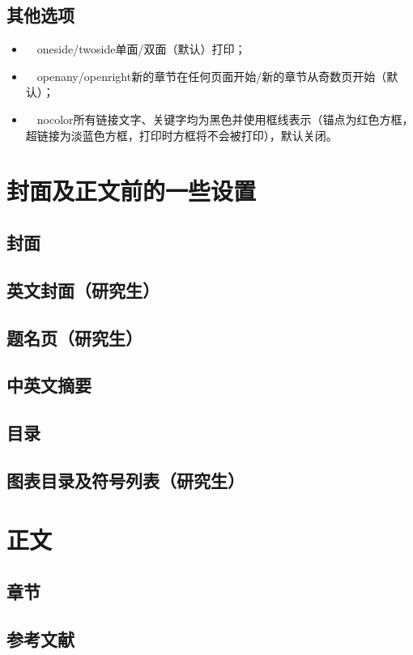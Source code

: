 		\subsection{其他选项}
		\begin{itemize}
			\item ~~oneside\slash twoside\quad 单面\slash 双面（默认）打印；\\
			\item ~~openany\slash openright\quad 新的章节在任何页面开始\slash 新的章节从奇数页开始（默认）；\\
			\item ~~nocolor\quad 所有链接文字、关键字均为黑色并使用框线表示（锚点为红色方框，超链接为淡蓝色方框，打印时方框将不会被打印），默认关闭。\\
		\end{itemize}
	\section{封面及正文前的一些设置}
		\subsection{封面}
		\subsection{英文封面（研究生）}
		\subsection{题名页（研究生）}
		\subsection{中英文摘要}
		\subsection{目录}
		\subsection{图表目录及符号列表（研究生）}
	\section{正文}
		\subsection{章节}
		\subsection{参考文献}
